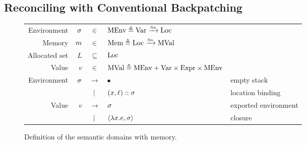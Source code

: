 \documentclass{article}
\begin{document}
\subsection{Reconciling with Conventional Backpatching}
\begin{figure}[h!]
  \centering
  \small
  \begin{tabular}{rrcll}
    Environment   & $\sigma$ & $\in$         & $\text{MEnv}\triangleq{\text{Var}}\xrightarrow{\mbox{\tiny{fin}}}{\text{Loc}}$                                         \\
    Memory        & $m$ & $\in$         & $\text{Mem}\triangleq{\text{Loc}}\xrightarrow{\mbox{\tiny{fin}}}{\text{MVal}}$                                           \\
    Allocated set & $L$    & $\subseteq$   & $\text{Loc}$                                                                       \\
    Value         & $v$    & $\in$         & $\text{MVal} \triangleq\text{MEnv}+\text{Var}\times\text{Expr}\times\text{MEnv}$                        \\
    Environment   & $\sigma$ & $\rightarrow$ & $\bullet$                                             & empty stack          \\
                  &        & $|$       & $(x,\ell)::\sigma$                                   & location binding     \\
    Value         & $v$    & $\rightarrow$ & $\sigma$                                                & exported environment \\
                  &        & $|$       & $\langle \lambda x.e, \sigma \rangle$                   & closure
  \end{tabular}
  \caption{Definition of the semantic domains with memory.}
  \label{fig:memdomain}
\end{figure}
\end{document}
